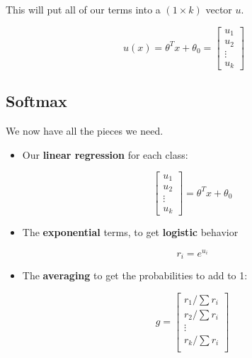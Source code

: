         This will put all of our terms into a $(1 \times k)$ vector $u$.
        
        \begin{equation}
            u(x) = 
            \theta^T x + \theta_0
            =
            \begin{bmatrix}
                u_1 \\ u_2 \\ \vdots \\ u_k
            \end{bmatrix}
        \end{equation}
    
    \subsection{Softmax}
        
        We now have all the pieces we need.
        
        \begin{itemize}
            \item Our \textbf{linear regression} for each class:

                \begin{equation}
                    \begin{bmatrix}
                        u_1 \\ u_2 \\ \vdots \\ u_k
                    \end{bmatrix}
                    = 
                    \theta^T x + \theta_0
                \end{equation}  
        
            \item The \textbf{exponential} terms, to get \textbf{logistic} behavior

                \begin{equation}
                    r_i = e^{u_i}
                \end{equation}

            \item The \textbf{averaging} to get the probabilities to add to 1:

                \begin{equation}
                    g = 
                    \begin{bmatrix}
                        r_1/\sum r_i  \\
                        r_2/\sum r_i  \\
                        \vdots  \\
                        r_k/\sum r_i  \\
                    \end{bmatrix}
                \end{equation}
        \end{itemize}
        

